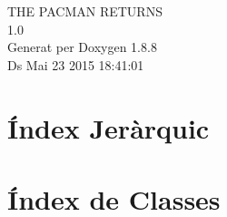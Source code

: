 \documentclass[twoside]{book}
\newcommand{\+}{\discretionary{\mbox{\scriptsize$\hookleftarrow$}}{}{}}
\newcommand{\clearemptydoublepage}{%
  \newpage{\pagestyle{empty}\cleardoublepage}%
}
\begin{document}
\hypersetup{pageanchor=false,
             bookmarks=true,
             bookmarksnumbered=true,
             pdfencoding=unicode
            }
\begin{titlepage}
\vspace*{7cm}
\begin{center}%
{\Large T\+H\+E P\+A\+C\+M\+A\+N R\+E\+T\+U\+R\+N\+S \\[1ex]\large 1.\+0 }\\
\vspace*{1cm}
{\large Generat per Doxygen 1.8.8}\\
\vspace*{0.5cm}
{\small Ds Mai 23 2015 18:41:01}\\
\end{center}
\end{titlepage}
\clearemptydoublepage
\tableofcontents
\clearemptydoublepage
{}
\hypersetup{pageanchor=true}

\chapter{Índex Jeràrquic}

\chapter{Índex de Classes}

\end{document}
